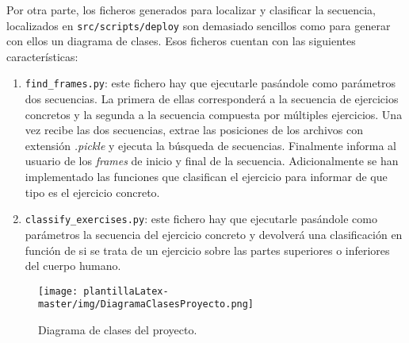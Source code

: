 Por otra parte, los ficheros generados para localizar y clasificar la secuencia, localizados en \texttt{src/scripts/deploy} son demasiado sencillos como para generar con ellos un diagrama de clases. Esos ficheros cuentan con las siguientes características:
\begin{enumerate}
    \item \texttt{find\_frames.py}: este fichero hay que ejecutarle pasándole como parámetros dos secuencias. La primera de ellas corresponderá a la secuencia de ejercicios concretos y la segunda a la secuencia compuesta por múltiples ejercicios. Una vez recibe las dos secuencias, extrae las posiciones de los archivos con extensión \textit{.pickle} y ejecuta la búsqueda de secuencias. Finalmente informa al usuario de los \textit{frames} de inicio y final de la secuencia. Adicionalmente se han implementado las funciones que clasifican el ejercicio para informar de que tipo es el ejercicio concreto.
    \item \texttt{classify\_exercises.py}: este fichero hay que ejecutarle pasándole como parámetros la secuencia del ejercicio concreto y devolverá una clasificación en función de si se trata de un ejercicio sobre las partes superiores o inferiores del cuerpo humano.
\end{enumerate}

\begin{figure}[H]
    \centering
    \texttt{[image: plantillaLatex-master/img/DiagramaClasesProyecto.png]}
    \caption{Diagrama de clases del proyecto.}
    \label{fig:DiagramaClasesProyecto}
\end{figure}

\newpage
